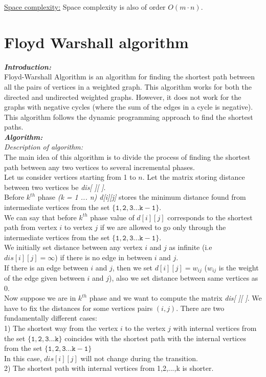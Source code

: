 \documentclass[12pt]{book}
\begin{document}
\underline{Space complexity:} 
Space complexity is also of order $O(m \cdot n)$.\\

\chapter{Floyd Warshall algorithm}
\textbf{\textit{Introduction:}}\\
Floyd-Warshall Algorithm is an algorithm for finding the shortest path between all the pairs of vertices in a weighted graph. This algorithm works for both the directed and undirected weighted graphs. However, it does not work for the graphs with negative cycles (where the sum of the edges in a cycle is negative). This algorithm follows the dynamic programming approach to find the shortest paths.\\
\textbf{\textit{Algorithm:}}\\
\textit{Description of algorithm:}\\
The main idea of this algorithm is to divide the process of finding the shortest path between any two vertices to several incremental phases.\\

Let us consider vertices starting from 1 to $n$. Let the matrix storing distance between two vertices be \textit{dis[ ][ ]}.\\
Before $k^{th}$ phase \textit{(k = 1 ... n) d[i][j]} stores the minimum distance found from intermediate vertices from the set $\mathtt{\{1, 2, 3 ... k-1\}}$.\\

We can say that before $k^{th}$ phase value of $d[i][j]$ corresponds to the shortest path from vertex $i$ to vertex $j$ if we are allowed to go only through the intermediate vertices from the set $\mathtt{\{1, 2, 3 ... k-1\}}$.\\
We initially set distance between any vertex $i$ and $j$ as infinite (i.e $dis[i][j] = \infty$) if there is no edge in between $i$ and $j$.\\
If there is an edge between $i$ and $j$, then we set $d[i][j] = w_{ij}$ ($w_{ij}$ is the weight of the edge given between $i$ and $j$), also we set distance between same vertices as 0.\\

Now suppose we are in $k^{th}$ phase and we want to compute the matrix \textit{dis[ ][ ]}. We have to fix the distances for some vertices pairs $(i, j)$. There are two fundamentally different cases:\\
    1) The shortest way from the vertex $i$ to the vertex $j$ with internal vertices from the set $\mathtt{\{1, 2, 3 ... k\}}$ coincides with the shortest path with the internal vertices from the set $\mathtt{\{1, 2, 3 ... k-1\}}$\\
 In this case, $dis[i][j]$ will not change during the transition.\\
    2) The shortest path with internal vertices from {1,2,...,k} is shorter.\\
\end{document}

